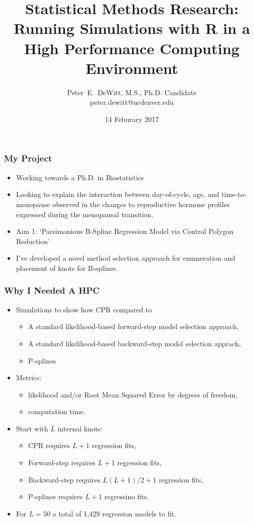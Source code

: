 \documentclass[10pt]{beamer}
\author[Peter~E.~DeWitt]{Peter~E.~DeWitt, M.S., Ph.D. Candidate\\{peter.dewitt@ucdenver.edu}\vspace{0.25in}}
\title[]{Statistical Methods Research:\\Running Simulations with R in a High Performance
Computing Environment}
\institute[CSPH, UCD, BIOS]{Colorado School of Public Health\\University of Colorado Denver\\Department of Biostatistics and Informatics}
\date{14 Feburary 2017}
\begin{document}
 
\watermarkoff

\begin{frame}[t,plain]
  \titlepage
\end{frame}

\begin{frame}[t]
  \frametitle{My Project}
  \begin{itemize}
    \item Working towards a Ph.D. in Biostatistics
    \item Looking to explain the interaction between day-of-cycle, age, and time-to-menopause
      observed in the changes to reproductive hormone profiles expressed during
      the menopausal transition.
    \item Aim 1: `Parsimonious B-Spline Regression Model via Control Polygon Reduction'
    \item I've developed a novel method selection approach for enumeration and
      placement of knots for B-splines.  
  \end{itemize}
\end{frame}

\begin{frame}[t]
  \frametitle{Why I Needed A HPC}
  \begin{itemize}
    \item Simulations to show how CPR compared to
      \begin{itemize}
        \item A standard likelihood-based forward-step model selection approach,
        \item A standard likelihood-based backward-step model selection apprach,
        \item P-splines
      \end{itemize}
    \item Metrics:
      \begin{itemize}
        \item likelihood and/or Root Mean Squared Error by degrees of freedom,
        \item computation time.
      \end{itemize} 

    \item Start with $L$ internal knots:
      \begin{itemize}
        \item CPR requires $L + 1$ regression fits,
        \item Forward-step requires $L + 1$ regression fits,
        \item Backward-step requires $L(L+1)/2 + 1$ regression fits,
        \item P-splines requires $L + 1$ regressino fits.
      \end{itemize}

    \item For $L = 50$ a total of 1,429 regression models to fit.
      
  \end{itemize}
\end{frame}
\end{document}
